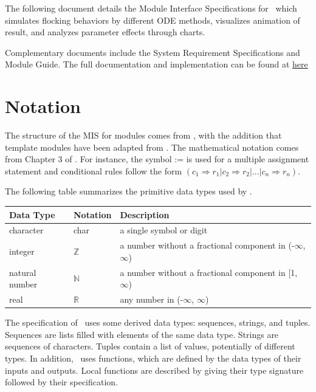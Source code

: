\documentclass[12pt, titlepage]{article}
\begin{document}
The following document details the Module Interface Specifications for
\progname \, which simulates flocking behaviors by different ODE methods, 
visualizes animation of result, and analyzes parameter effects through charts.

Complementary documents include the System Requirement Specifications
and Module Guide. The full documentation and implementation can be
found at \href{https://mei0725.github.io/FlockingSimulator/}{here}

\section{Notation}

The structure of the MIS for modules comes from \citet{HoffmanAndStrooper1995},
with the addition that template modules have been adapted from
\cite{GhezziEtAl2003}.  The mathematical notation comes from Chapter 3 of
\citet{HoffmanAndStrooper1995}.  For instance, the symbol := is used for a
multiple assignment statement and conditional rules follow the form $(c_1
\Rightarrow r_1 | c_2 \Rightarrow r_2 | ... | c_n \Rightarrow r_n )$.

The following table summarizes the primitive data types used by \progname. 

\begin{center}
\renewcommand{\arraystretch}{1.2}
\noindent 
\begin{tabular}{l l p{7.5cm}} 
\toprule 
\textbf{Data Type} & \textbf{Notation} & \textbf{Description}\\ 
\midrule
character & char & a single symbol or digit\\
integer & $\mathbb{Z}$ & a number without a fractional component in (-$\infty$, $\infty$) \\
natural number & $\mathbb{N}$ & a number without a fractional component in [1, $\infty$) \\
real & $\mathbb{R}$ & any number in (-$\infty$, $\infty$)\\
\bottomrule
\end{tabular} 
\end{center}

\noindent
The specification of \progname \ uses some derived data types: sequences, strings, and
tuples. Sequences are lists filled with elements of the same data type. Strings
are sequences of characters. Tuples contain a list of values, potentially of
different types. In addition, \progname \ uses functions, which
are defined by the data types of their inputs and outputs. Local functions are
described by giving their type signature followed by their specification.
\end{document}
